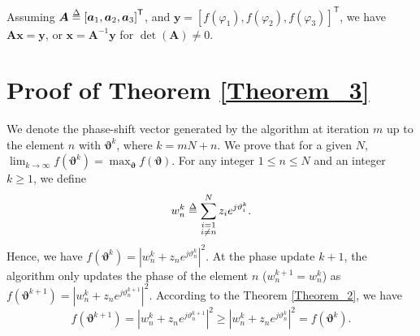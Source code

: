 \documentclass[conference]{IEEEtran}
\begin{document}
Assuming $\bm{A}\delequal \left[\bm{a}_{1}, \bm{a}_{2}, \bm{a}_{3}\right]^\mathsf{T}$, and $\bm{y}=\left[f{\left(\varphi_{1}\right)}, f{\left(\varphi_{2}\right)}, f{\left(\varphi_{3}\right)}\right]^{\mathsf{T}}$, we have $\bm{A}\bm{x}=\bm{y}$, or $\bm{x}=\bm{A}^{-1}\bm{y}$ for $\det{\left(\bm{A}\right)}\neq 0$. 


\section{Proof of Theorem \ref{Theorem_3}}\label{App_T3}
We denote the phase-shift vector generated by the algorithm at iteration $m$ up to the element $n$ with $\bm{\vartheta}^{k}$, where $k=mN+n$. We prove that for a given $N$, $\lim_{k\to\infty} f{\left(\bm{\vartheta}^{k}\right)}=\max_{\bm{\vartheta}}f{\left(\bm{\vartheta}\right)}$.
For any integer $1\leq n\leq N$ and an integer $k\geq 1$, we define 
\begin{equation}
    w_{n}^{k}\delequal \sum_{\substack{i=1\\i\neq n}}^{N} z_{i}e^{j\vartheta^{k}_{i}}.
\end{equation} 
Hence, we have $f{\left(\bm{\vartheta}^{k}\right)} = \left|w^{k}_{n}+z_{n}e^{j\vartheta^{k}_{n}}\right|^2$.
At the phase update $k+1$, the algorithm only updates the phase of the element $n$ ($w^{k+1}_{n}=w^{k}_{n}$) as $f{\left(\bm{\vartheta}^{k+1}\right)} = \left|w^{k}_{n}+z_{n}e^{j\vartheta^{k+1}_{n}}\right|^2$.
According to the Theorem \ref{Theorem_2}, we have
\begin{equation}
    f{\left(\bm{\vartheta}^{k+1}\right)} \!=\! \left|\!w^{k}_{n}\!+\!z_{n}e^{j\vartheta^{k+1}_{n}}\!\right|^2\!\geq\! \left|w^{k}_{n}\!+\!z_{n}e^{j\vartheta^{k}_{n}}\right|^2\!=\!f{\left(\bm{\vartheta}^{k}\right)}.
\end{equation}
\end{document}
